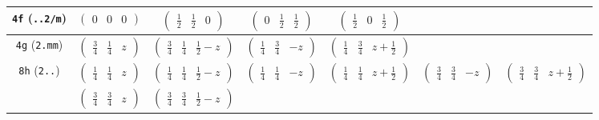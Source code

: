 \documentclass[fleqn,9pt,landscape]{jsarticle}
\begin{document}
\begin{center}
\begin{longtable}{ccccccc}
{\tt 4f} ({\tt ..2/m}) & $ \begin{pmatrix} 0 & 0 & 0 \end{pmatrix} $ & $ \begin{pmatrix} \frac{1}{2} & \frac{1}{2} & 0 \end{pmatrix} $ & $ \begin{pmatrix} 0 & \frac{1}{2} & \frac{1}{2} \end{pmatrix} $ & $ \begin{pmatrix} \frac{1}{2} & 0 & \frac{1}{2} \end{pmatrix} $ & $  $ & $  $ \\ \hline
{\tt 4g} ({\tt 2.mm}) & $ \begin{pmatrix} \frac{3}{4} & \frac{1}{4} & z \end{pmatrix} $ & $ \begin{pmatrix} \frac{3}{4} & \frac{1}{4} & \frac{1}{2} - z \end{pmatrix} $ & $ \begin{pmatrix} \frac{1}{4} & \frac{3}{4} & - z \end{pmatrix} $ & $ \begin{pmatrix} \frac{1}{4} & \frac{3}{4} & z + \frac{1}{2} \end{pmatrix} $ & $  $ & $  $ \\ \hline
{\tt 8h} ({\tt 2..}) & $ \begin{pmatrix} \frac{1}{4} & \frac{1}{4} & z \end{pmatrix} $ & $ \begin{pmatrix} \frac{1}{4} & \frac{1}{4} & \frac{1}{2} - z \end{pmatrix} $ & $ \begin{pmatrix} \frac{1}{4} & \frac{1}{4} & - z \end{pmatrix} $ & $ \begin{pmatrix} \frac{1}{4} & \frac{1}{4} & z + \frac{1}{2} \end{pmatrix} $ & $ \begin{pmatrix} \frac{3}{4} & \frac{3}{4} & - z \end{pmatrix} $ & $ \begin{pmatrix} \frac{3}{4} & \frac{3}{4} & z + \frac{1}{2} \end{pmatrix} $ \\
& $ \begin{pmatrix} \frac{3}{4} & \frac{3}{4} & z \end{pmatrix} $ & $ \begin{pmatrix} \frac{3}{4} & \frac{3}{4} & \frac{1}{2} - z \end{pmatrix} $ & $  $ & $  $ & $  $ & $  $ \\ \hline

\end{longtable}
\end{center}
\end{document}
